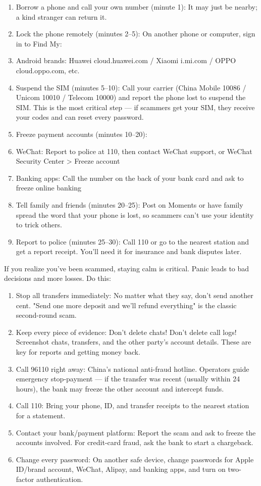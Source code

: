 \begin{enumerate}
  \item Borrow a phone and call your own number (minute 1): It may just be nearby; a kind stranger can return it.
  \item Lock the phone remotely (minutes 2–5): On another phone or computer, sign in to Find My:
  \item Android brands: Huawei cloud.huawei.com / Xiaomi i.mi.com / OPPO cloud.oppo.com, etc.
  \item Suspend the SIM (minutes 5–10): Call your carrier (China Mobile 10086 / Unicom 10010 / Telecom 10000) and report the phone lost to suspend the SIM. This is the most critical step — if scammers get your SIM, they receive your codes and can reset every password.
  \item Freeze payment accounts (minutes 10–20):
  \item WeChat: Report to police at 110, then contact WeChat support, or WeChat Security Center > Freeze account
  \item Banking apps: Call the number on the back of your bank card and ask to freeze online banking
  \item Tell family and friends (minutes 20–25): Post on Moments or have family spread the word that your phone is lost, so scammers can't use your identity to trick others.
  \item Report to police (minutes 25–30): Call 110 or go to the nearest station and get a report receipt. You'll need it for insurance and bank disputes later.
\end{enumerate}


If you realize you've been scammed, staying calm is critical. Panic leads to bad decisions and more losses. Do this:

\begin{enumerate}
  \item Stop all transfers immediately: No matter what they say, don't send another cent. "Send one more deposit and we'll refund everything" is the classic second-round scam.
  \item Keep every piece of evidence: Don't delete chats! Don't delete call logs! Screenshot chats, transfers, and the other party's account details. These are key for reports and getting money back.
  \item Call 96110 right away: China's national anti-fraud hotline. Operators guide emergency stop-payment — if the transfer was recent (usually within 24 hours), the bank may freeze the other account and intercept funds.
  \item Call 110: Bring your phone, ID, and transfer receipts to the nearest station for a statement.
  \item Contact your bank/payment platform: Report the scam and ask to freeze the accounts involved. For credit-card fraud, ask the bank to start a chargeback.
  \item Change every password: On another safe device, change passwords for Apple ID/brand account, WeChat, Alipay, and banking apps, and turn on two-factor authentication.
\end{enumerate}

